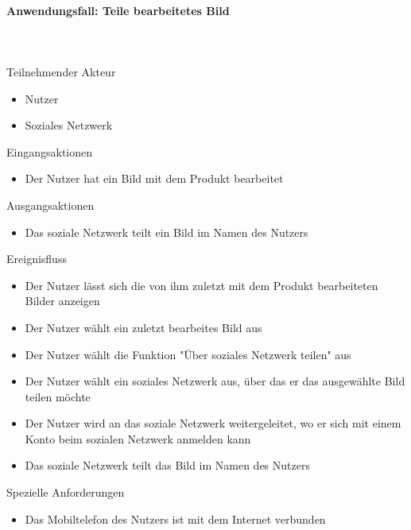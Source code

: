 \documentclass[parskip=full]{scrartcl}
\newcommand{\paragraphashead}[1]{\paragraph{#1}\mbox{}\\\\}
\begin{document}
\paragraphashead{Anwendungsfall: Teile bearbeitetes Bild}
Teilnehmender Akteur
    \begin{itemize}\setlength\itemsep{-1em}
        \item Nutzer
        \item Soziales Netzwerk
    \end{itemize}
Eingangsaktionen
	\begin{itemize}\setlength\itemsep{-1em}
    	\item Der Nutzer hat ein Bild mit dem Produkt bearbeitet
    \end{itemize}
Ausgangsaktionen
	\begin{itemize}\setlength\itemsep{-1em}
        \item Das soziale Netzwerk teilt ein Bild im Namen des Nutzers
    \end{itemize}
Ereignisfluss
	\begin{itemize}\setlength\itemsep{-1em}
    	\item Der Nutzer lässt sich die von ihm zuletzt mit dem Produkt bearbeiteten Bilder anzeigen
        \item Der Nutzer wählt ein zuletzt bearbeites Bild aus
        \item Der Nutzer wählt die Funktion "Über soziales Netzwerk teilen" aus
        \item Der Nutzer wählt ein soziales Netzwerk aus, über das er das ausgewählte Bild teilen möchte
        \item Der Nutzer wird an das soziale Netzwerk weitergeleitet, wo er sich mit einem Konto beim sozialen Netzwerk anmelden kann
        \item Das soziale Netzwerk teilt das Bild im Namen des Nutzers
    \end{itemize}
Spezielle Anforderungen
\begin{itemize}\setlength\itemsep{-1em}
  \item Das Mobiltelefon des Nutzers ist mit dem Internet verbunden
\end{itemize}

\newpage

%
%
\printnoidxglossaries
\end{document}
